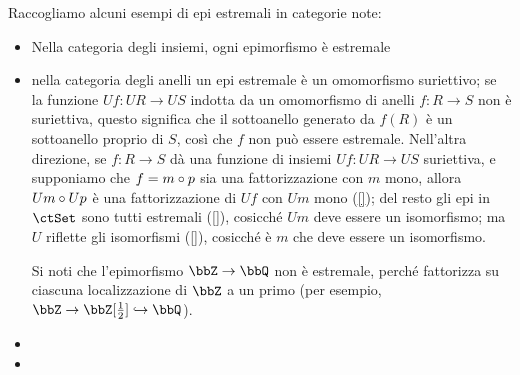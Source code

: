 \begin{remark}
	Raccogliamo alcuni esempi di epi estremali in categorie note: 
	\begin{itemize}
		\item Nella categoria degli insiemi, ogni epimorfismo è estremale \Todo{}
		\item nella categoria degli anelli un epi estremale è un omomorfismo suriettivo; se la funzione $Uf : UR\to US$ indotta da un omomorfismo di anelli $f : R\to S$ non è suriettiva, questo significa che il sottoanello generato da $f(R)$ è un sottoanello proprio di $S$, così che $f$ non può essere estremale. Nell'altra direzione, se $f : R\to S$ dà una funzione di insiemi $Uf : UR\to US$ suriettiva, e supponiamo che $f = m\circ p$ sia una fattorizzazione con $m$ mono, allora $Um\circ Up$ è una fattorizzazione di $Uf$ con $Um$ mono (\ref{}); del resto gli epi in $\ctSet$ sono tutti estremali (\ref{}), cosicché $Um$ deve essere un isomorfismo; ma $U$ riflette gli isomorfismi (\ref{}), cosicché è $m$ che deve essere un isomorfismo.
		
		Si noti che l'epimorfismo $\bbZ\to\bbQ$ non è estremale, perché fattorizza su ciascuna localizzazione di $\bbZ$ a un primo (per esempio, $\bbZ \to \bbZ[\frac 12]\mono \bbQ$).
		\item 
		\item 
	\end{itemize}
\end{remark}
